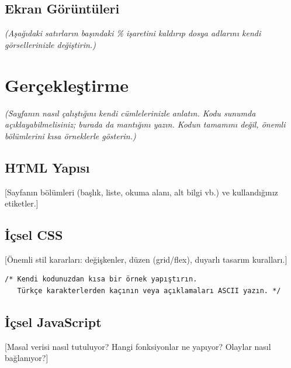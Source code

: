 \documentclass[12pt,a4paper]{article}
\newcommand{\aciklama}[1]{{\color{gray}\itshape (#1)}}
\begin{document}
\subsection{Ekran Görüntüleri}
\aciklama{Aşağıdaki satırların başındaki \% işaretini kaldırıp dosya adlarını kendi
görsellerinizle değiştirin.}

\section{Gerçekleştirme}
\aciklama{Sayfanın nasıl çalıştığını kendi cümlelerinizle anlatın. Kodu sunumda
açıklayabilmelisiniz; burada da mantığını yazın. Kodun tamamını değil, önemli
bölümlerini kısa örneklerle gösterin.}

\subsection{HTML Yapısı}
[Sayfanın bölümleri (başlık, liste, okuma alanı, alt bilgi vb.) ve kullandığınız etiketler.]

\subsection{İçsel CSS}
[Önemli stil kararları: değişkenler, düzen (grid/flex), duyarlı tasarım kuralları.]

\begin{lstlisting}[caption={İçsel CSS'ten önemli bir bölüm}]
/* Kendi kodunuzdan kısa bir örnek yapıştırın.
   Türkçe karakterlerden kaçının veya açıklamaları ASCII yazın. */
\end{lstlisting}

\subsection{İçsel JavaScript}
[Masal verisi nasıl tutuluyor? Hangi fonksiyonlar ne yapıyor? Olaylar nasıl bağlanıyor?]
\end{document}

